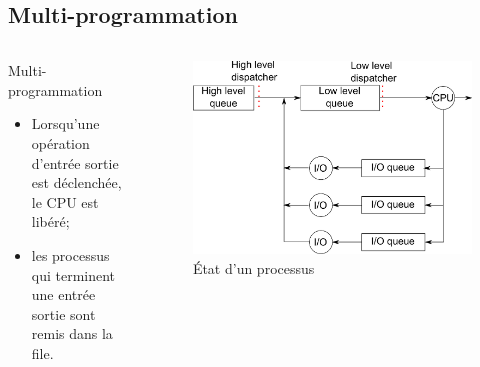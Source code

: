 \begin{frame}{\sectitle}
\def\subsectitle{Multi-programmation}
\subsection{\subsectitle}

\begin{columns}[c]
\begin{block}{\subsectitle}
\begin{itemize}
    \item Lorsqu'une opération d'entrée sortie est déclenchée, le CPU est
    libéré;
    \item les processus qui terminent une entrée sortie sont remis dans la file.
\end{itemize}
\end{block}

\begin{figure}
\includegraphics[width=\textwidth]{images/multiprogDispatching.pdf}
\caption{État d'un processus}
\end{figure}
\end{columns}

\end{frame}

\def\sectitle{Temps partagé}
